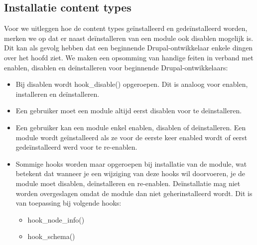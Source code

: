 
\subsection{Installatie content types}
Voor we uitleggen hoe de content types ge\"{i}nstalleerd en gede\"{i}nstalleerd worden, merken we op dat er naast de\"{i}nstalleren van een module ook disablen mogelijk is. Dit kan als gevolg hebben dat een beginnende Drupal-ontwikkelaar enkele dingen over het hoofd ziet. We maken een opsomming van handige feiten in verband met enablen, disablen en de\"{i}nstalleren voor beginnende Drupal-ontwikkelaars:
\begin{itemize}
\item Bij disablen wordt hook\_disable() opgeroepen. Dit is analoog voor enablen, installeren en de\"{i}nstalleren.
\item Een gebruiker moet een module altijd eerst disablen voor te de\"{i}nstalleren.
\item Een gebruiker kan een module enkel enablen, disablen of de\"{i}nstalleren. Een module wordt ge\"{i}nstalleerd als ze voor de eerste keer enabled wordt of eerst gede\"{i}nstalleerd werd voor te re-enablen.
\item Sommige hooks worden maar opgeroepen bij installatie van de module, wat betekent dat wanneer je een wijziging van deze hooks wil doorvoeren, je de module moet disablen, de\"{i}nstalleren en re-enablen. De\"{i}nstallatie mag niet worden overgeslagen omdat de module dan niet geherinstalleerd wordt. Dit is van toepassing bij volgende hooks:
\begin{itemize}
\item hook\_node\_info()
\item hook\_schema()
\end{itemize}
\end{itemize}

